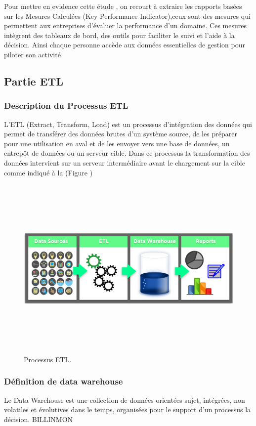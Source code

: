 Pour mettre en evidence cette \'{e}tude  , on recourt \`{a} extraire les rapports bas\'{e}es sur
les Mesures Calcul\'{e}es (Key Performance Indicator),ceux sont des mesures qui permettent aux entreprises d'\'{e}valuer la performance d'un
domaine.
Ces mesures int\`{e}grent des tableaux de bord, des outils pour faciliter le suivi et l'aide
\`{a} la d\'{e}cision. Ainsi chaque personne acc\`{e}de aux donn\'{e}es essentielles de gestion pour
piloter son activit\'{e}



\subsection{ Partie ETL }

\subsubsection{Description du Processus ETL }

L'ETL (Extract, Transform, Load) est un processus d'int\'{e}gration des donn\'{e}es qui permet de transf\'{e}rer des donn\'{e}es brutes d'un syst\`{e}me source, de les pr\'{e}parer pour une utilisation en aval et de les envoyer vers une base de donn\'{e}es, un entrep\^{o}t de donn\'{e}es ou un serveur cible. Dans ce processus la transformation des donn\'{e}es intervient sur un serveur interm\'{e}diaire avant le chargement sur la cible comme indiqué
\`{a} la (Figure )
\begin{figure}[H]
\center
\includegraphics[width=14cm,height=9cm]{./figures/bi1.png}
\caption{Processus ETL.}
\end{figure}


\subsubsection{D\'{e}finition de data warehouse}
\guillemotleft{}Le Data Warehouse est une collection de donn\'{e}es orient\'{e}es sujet,
int\'{e}gr\'{e}es, non volatiles et \'{e}volutives dans le temps, organis\'{e}es pour le
support d'un processus la d\'{e}cision.\guillemotright{} BILLINMON


